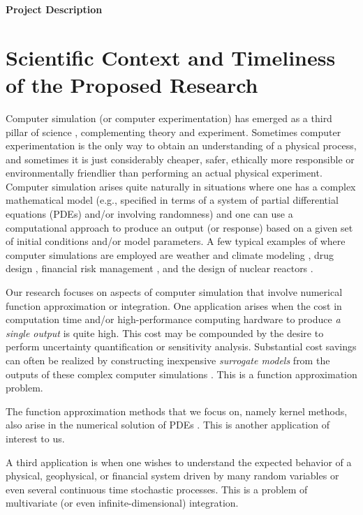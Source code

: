 \documentclass[11pt]{NSFamsart}
\begin{document}

\centerline{\Large \bf Project Description}
\section{Scientific Context and Timeliness of the Proposed Research}
Computer simulation (or computer experimentation) has emerged as a third pillar of science \citep{PITAC05,OdenGhattas14}, complementing theory and experiment. Sometimes computer experimentation is the only way to obtain an understanding of a physical process, and sometimes it is just considerably cheaper, safer, ethically more responsible or environmentally friendlier than performing an actual physical experiment.  Computer simulation arises quite naturally in situations where one has a complex mathematical model (e.g., specified in terms of a system of partial differential equations (PDEs) and/or involving randomness) and one can use a computational approach to produce an output (or response) based on a given set of initial conditions and/or model parameters. A few typical examples of where computer simulations are employed are weather and climate modeling \citep{Lynch08}, drug design \citep{Baron12}, financial risk management \citep{Gla03}, and the design of nuclear reactors \citep[Sect.\ 2.4]{Smi14a}.

Our research focuses on aspects of computer simulation that involve numerical function approximation or integration.  One application arises when the cost in computation time and/or high-performance computing hardware to produce \emph{a single output} is quite high.  This cost may be compounded by the desire to perform uncertainty quantification or sensitivity analysis. Substantial cost savings can often be realized by constructing inexpensive \emph{surrogate models} from the outputs of these complex computer simulations \citep{FangEtAl06,ForEtal09,SantnerWilliamsNotz03}.  This is a function approximation problem.

The function approximation methods that we focus on, namely kernel methods, also arise in the numerical solution of PDEs \citep{ChenEtAl14,FornbergFlyer15,SarraKansa09}.  This is another application of interest to us.

A third application is when one wishes to understand the expected behavior of a physical, geophysical, or financial system driven by many random variables or even several continuous time stochastic processes.  This is a problem of multivariate (or even infinite-dimensional) integration.
\end{document}
